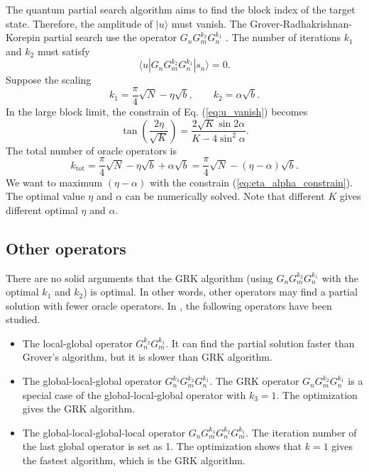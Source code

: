 \documentclass[a4paper,10pt]{article}
\numberwithin{equation}{section}
\begin{document}
The quantum partial search algorithm aims to find the block index of the target state. Therefore, the amplitude of $|u\rangle$ must vanish. The Grover-Radhakrishnan-Korepin partial search use the operator $G_nG^{k_2}_mG_n^{k_1}$ \cite{GR05,Korepin05,KG06}. The number of iterations $k_1$ and $k_2$ must satisfy
\begin{equation}
\label{eq:u_vanish}
    \langle u|G_nG^{k_2}_mG_n^{k_1}|s_n\rangle = 0.
\end{equation}
Suppose the scaling
\begin{equation}
    k_1 = \frac \pi 4\sqrt N-\eta\sqrt b,\qquad k_2 = \alpha\sqrt b.
\end{equation}
In the large block limit, the constrain of Eq. (\ref{eq:u_vanish}) becomes \cite{Korepin05}
\begin{equation}
\label{eq:eta_alpha_constrain}
    \tan\left(\frac{2\eta}{\sqrt K}\right) = \frac{2\sqrt K\sin 2\alpha}{K-4\sin^2\alpha}.
\end{equation}
The total number of oracle operators is
\begin{equation}
    k_\text{tot} = \frac \pi 4\sqrt N-\eta\sqrt b + \alpha\sqrt b = \frac \pi 4\sqrt N - (\eta-\alpha)\sqrt b.
\end{equation}
We want to maximum $(\eta-\alpha)$ with the constrain (\ref{eq:eta_alpha_constrain}). The optimal value $\eta$ and $\alpha$ can be numerically solved. Note that different $K$ gives different optimal $\eta$ and $\alpha$. 

\subsection{Other operators}

There are no solid arguments that the GRK algorithm (using $G_nG^{k_2}_mG_n^{k_1}$ with the optimal $k_1$ and $k_2$) is optimal. In other words, other operators may find a partial solution with fewer oracle operators. In \cite{korepin2006quest}, the following operators have been studied. 
\begin{itemize}
    \item The local-global operator $G^{k_2}_nG^{k_1}_m$. It can find the partial solution faster than Grover's algorithm, but it is slower than GRK algorithm. 

    \item The global-local-global operator $G^{k_3}_nG^{k_2}_mG^{k_1}_n$. The GRK operator $G_nG^{k_2}_mG_n^{k_1}$ is a special case of the global-local-global operator with $k_3=1$. The optimization gives the GRK algorithm. 

    \item The global-local-global-local operator $G_nG^{k_3}_mG^{k_2}_nG^{k_1}_m$. The iteration number of the last global operator is set as 1. The optimization shows that $k=1$ gives the fastest algorithm, which is the GRK algorithm. 
\end{itemize}
\end{document}
